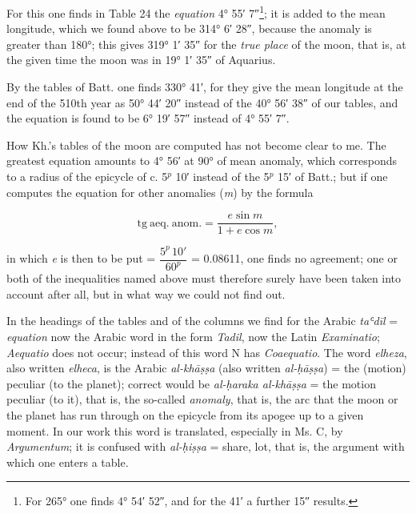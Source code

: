 \documentclass[11pt]{article}
\newcommand{\Pg}[1]{\marginpar{\footnotesize\color{gray}#1}}
\begin{document}
\par For this one finds in Table 24 the \emph{equation} 4° 55′ 7″\footnote{For 265° one finds 4° 54′ 52″, and for the 41′ a further 15″ results.}; it is added to the mean longitude, which we found above to be 314° 6′ 28″, because the anomaly is greater than 180°; this gives 319° 1′ 35″ for the \emph{true place} of the moon, that is, at the given time the moon was in 19° 1′ 35″ of Aquarius.\par
\par \Pg{46}By the tables of Batt. one finds 330° 41′, for they give the mean longitude at the end of the 510th year as 50° 44′ 20″ instead of the 40° 56′ 38″ of our tables, and the equation is found to be 6° 19′ 57″ instead of 4° 55′ 7″.\par
\par How Kh.'s tables of the moon are computed has not become clear to me. The greatest equation amounts to 4° 56′ at 90° of mean anomaly, which corresponds to a radius of the epicycle of c. 5$^{p}$ 10′ instead of the 5$^{p}$ 15′ of Batt.; but if one computes the equation for other anomalies (\emph{m}) by the formula\par
\par\smallskip\[\mathrm{tg\ aeq.\ anom.} = \dfrac{e\sin m}{1+e\cos m},\]\par\smallskip
\par in which \emph{e} is then to be put = $\dfrac{5^{p}\,10'}{60^{p}}$ = 0.08611, one finds no agreement; one or both of the inequalities named above must therefore surely have been taken into account after all, but in what way we could not find out.\par
\par In the headings of the tables and of the columns we find for the Arabic \emph{taʿdīl} = \emph{equation} now the Arabic word in the form \emph{Tadil}, now the Latin \emph{Examinatio}; \emph{Aequatio} does not occur; instead of this word N has \emph{Coaequatio}. The word \emph{elheza}, also written \emph{elheca}, is the Arabic \emph{al-khāṣṣa} (also written \emph{al-ḥāṣṣa}) = the (motion) peculiar (to the planet); correct would be \emph{al-ḥaraka al-khāṣṣa} = the motion peculiar (to it), that is, the so-called \emph{anomaly}, that is, the arc that the moon or the planet has run through on the epicycle from its apogee up to a given moment. In our work this word is translated, especially in Ms. C, by \emph{Argumentum}; it is confused with \emph{al-ḥiṣṣa} = share, lot, that is, the argument with which one enters a table.\par
\end{document}
